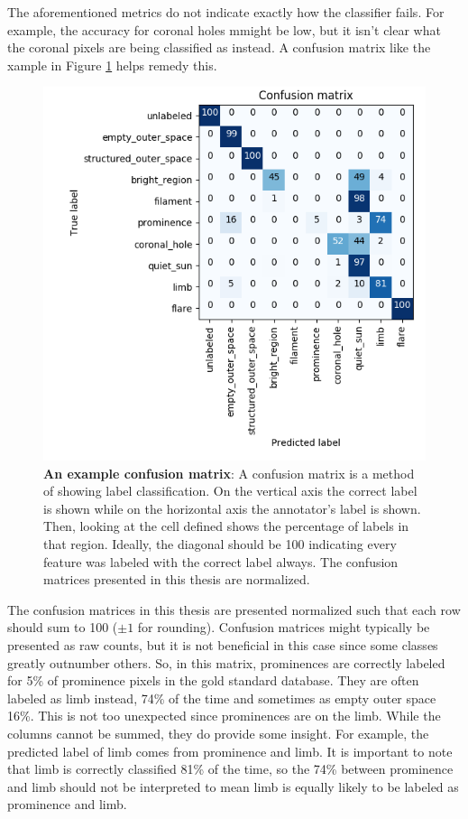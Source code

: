 \documentclass[twoside]{report}
\begin{document}
The aforementioned metrics do not indicate exactly how the classifier fails. For example, the accuracy for coronal holes mmight be low, but it isn't clear what the coronal pixels are being classified as instead. A confusion matrix like the xample in Figure \ref{fig:exampleconfusionmatrix} helps remedy this.

\begin{figure}[ht]
  \begin{center}
    \includegraphics[scale=0.8]{confusion_matrix_example}
    \caption{{\bf An example confusion matrix}: A confusion matrix is a method of showing label classification. On the vertical axis the correct label is shown while on the horizontal axis the annotator's label is shown. Then, looking at the cell defined shows the percentage of labels in that region. Ideally, the diagonal should be 100 indicating every feature was labeled with the correct label always. The confusion matrices presented in this thesis are normalized.}
    \label{fig:exampleconfusionmatrix}
 \end{center}
\end{figure}

The confusion matrices in this thesis are presented normalized such that each row should sum to 100 ($\pm 1$ for rounding). Confusion matrices might typically be presented as raw counts, but it is not beneficial in this case since some classes greatly outnumber others. So, in this matrix, prominences are correctly labeled for 5\% of prominence pixels in the gold standard database. They are often labeled as limb instead, 74\% of the time and sometimes as empty outer space 16\%. This is not too unexpected since prominences are on the limb. While the columns cannot be summed, they do provide some insight. For example, the predicted label of limb comes from prominence and limb. It is important to note that limb is correctly classified 81\% of the time, so the 74\% between prominence and limb should not be interpreted to mean limb is equally likely to be labeled as prominence and limb. 
\end{document}
